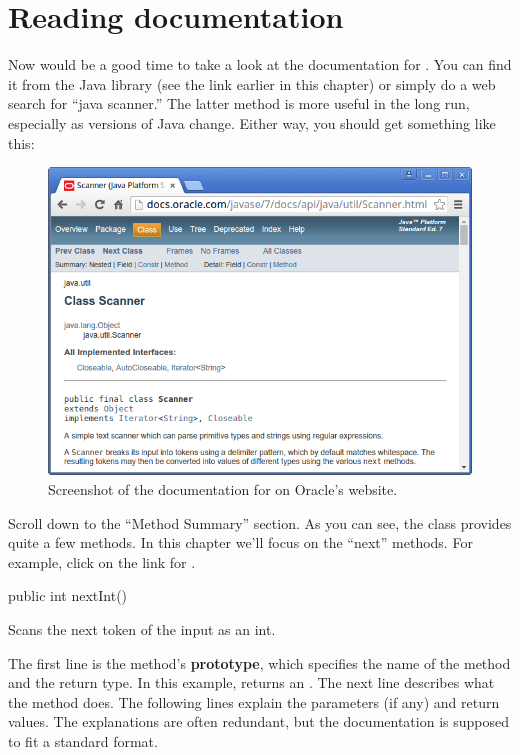 \section{Reading documentation}
\label{documentation}


Now would be a good time to take a look at the documentation for .
You can find it from the Java library (see the link earlier in this chapter) or simply do a web search for ``java scanner.''
The latter method is more useful in the long run, especially as versions of Java change.
Either way, you should get something like this:

\begin{figure}[h!]
\includegraphics[width=\textwidth]{scanner.png}
\caption{Screenshot of the documentation for  on Oracle's website.}
\end{figure}

Scroll down to the ``Method Summary'' section.
As you can see, the  class provides quite a few methods.
In this chapter we'll focus on the ``next'' methods.
For example, click on the link for .

\begin{stdout}
public int nextInt()

Scans the next token of the input as an int.
\end{stdout}


The first line is the method's {\bf prototype}, which specifies the name of the method and the return type.
In this example,  returns an .
The next line describes what the method does.
The following lines explain the parameters (if any) and return values.
The explanations are often redundant, but the documentation is supposed to fit a standard format.

